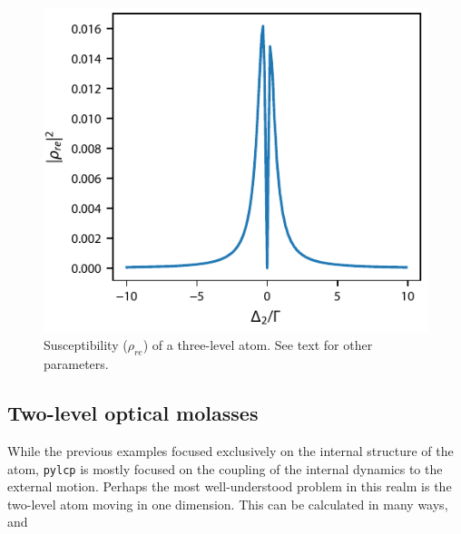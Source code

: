 \documentclass[final,5p,times,twocolumn]{elsarticle}
\begin{document}
\begin{figure}
	\center
	\includegraphics{figs/eit_susceptibility.pdf}
	\caption{\label{fig:eit_susceptibility} Susceptibility ($\rho_{re}$) of a three-level atom.  See text for other parameters.}
\end{figure}


\subsection{Two-level optical molasses}
While the previous examples focused exclusively on the internal structure of the atom, {\tt pylcp} is mostly focused on the coupling of the internal dynamics to the external motion.  Perhaps the most well-understood problem in this realm is the two-level atom moving in one dimension.  This can be calculated in many ways, and 
\end{document}
